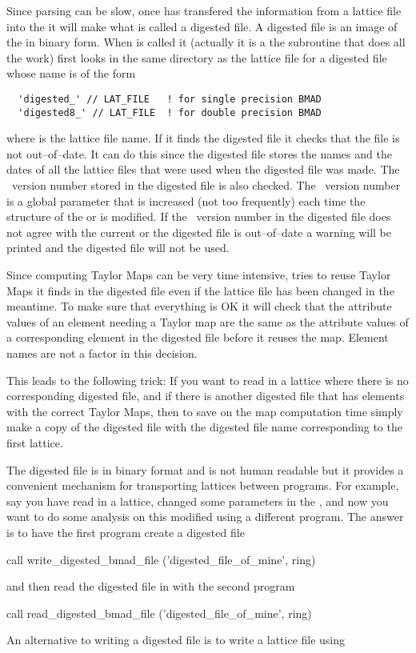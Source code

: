 Since parsing can be slow, once  has transfered the
information from a lattice file into the  it will make
what is called a digested file. A digested file is an image of the
 in binary form. When  is called it
(actually it is a the subroutine  that
does all the work) first looks in the same directory as the lattice
file for a digested file whose name is of the form
\begin{verbatim}
  'digested_' // LAT_FILE   ! for single precision BMAD 
  'digested8_' // LAT_FILE  ! for double precision BMAD 
\end{verbatim}
where  is the lattice file name. If it finds the digested
file it checks that the file is not out--of--date. It can do this
since the digested file stores the names and the dates of all the
lattice files that were used when the digested file was made. The
\bmad\ version number stored in the digested file is also checked. The
\bmad\ version number is a global parameter that is increased (not too
frequently) each time the structure of the  or
 is modified. If the \bmad\ version number in the
digested file does not agree with the current or the digested file is
out--of--date a warning will be printed and the digested file will not
be used.

Since computing Taylor Maps can be very time intensive,
 tries to reuse Taylor Maps it finds in the digested
file even if the lattice file has been changed in the meantime. To
make sure that everything is OK it will check that the attribute
values of an element needing a Taylor map are the same as the
attribute values of a corresponding element in the digested file
before it reuses the map. Element names are not a factor in this
decision.

This leads to the following trick: If you want to read in a lattice
where there is no corresponding digested file, and if there is another
digested file that has elements with the correct Taylor Maps, then to
save on the map computation time simply make a copy of the digested
file with the digested file name corresponding to the first lattice.

The digested file is in binary format and is not human readable but it
provides a convenient mechanism for transporting lattices between
programs. For example, say you have read in a lattice, changed
some parameters in the , and now you want to do some
analysis on this modified  using a different program. The 
answer is to have the first program create a digested file
\begin{example}
  call write_digested_bmad_file ('digested_file_of_mine', ring)
\end{example}
and then read the digested file in with the second program
\begin{example}
  call read_digested_bmad_file ('digested_file_of_mine', ring)
\end{example}
An alternative to writing a digested file is to write a lattice file
using 

